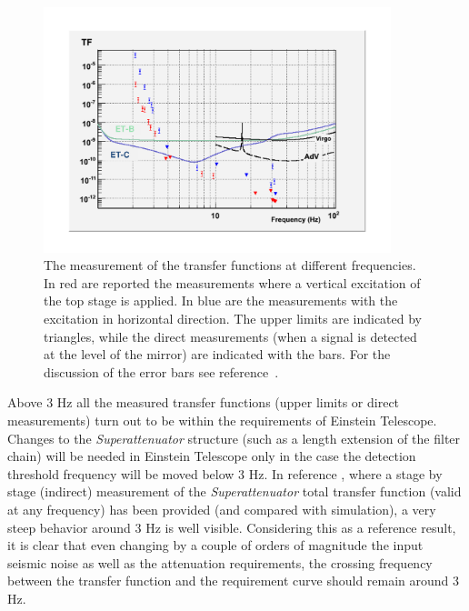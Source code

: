 \begin{figure}[t]
	\begin{center}
		\includegraphics[width=0.9\textwidth]{./Sec_Suspensions/Figures/Fig5.pdf}
			\caption{The measurement of the transfer functions at different frequencies. In red are reported the measurements where a vertical excitation of the top stage is applied. In blue are the measurements with the excitation in horizontal direction. The upper limits are indicated by triangles, while the direct measurements (when a signal is detected at the level of the mirror) are indicated with the bars. For the discussion of the error bars see reference~\cite{Collaboration2010}.}
\label{FigSusp5}
	\end{center}
\end{figure}

Above 3 Hz all the measured transfer functions (upper limits or direct measurements) turn out to be within the requirements of Einstein Telescope. Changes to the \emph{Superattenuator} structure (such as a length extension of the filter chain) will be needed in Einstein Telescope only in the case the detection threshold frequency will be moved below 3 Hz. In reference \cite{Ballardin2001}, where a stage by stage (indirect) measurement of the \emph{Superattenuator} total transfer function (valid at any frequency) has been provided (and compared with simulation), a very steep behavior around 3 Hz is well visible. Considering this as a reference result, it is clear that even changing by a couple of orders of magnitude the input seismic noise as well as the attenuation requirements, the crossing frequency between the transfer function and the requirement curve should remain around 3 Hz. 

